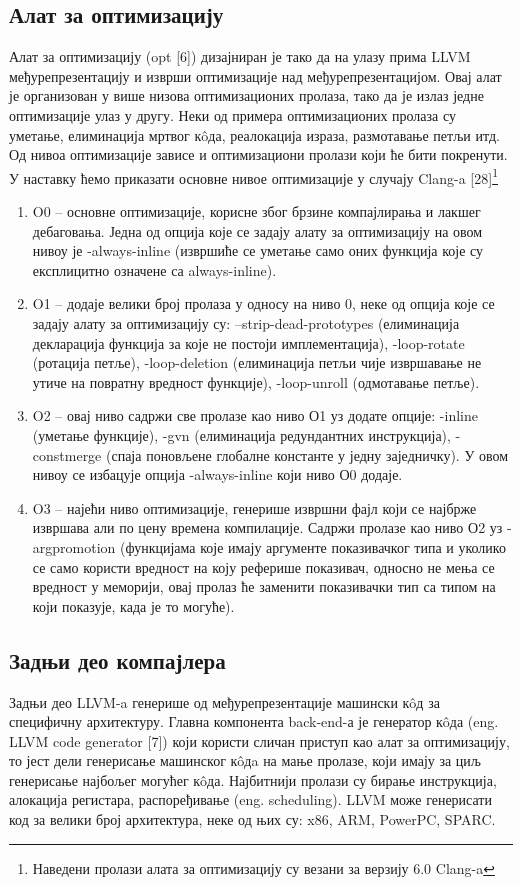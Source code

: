 \documentclass[12pt,oneside]{memoir}
\begin{document}
 \subsection{Алат за оптимизацију}
 Алат за оптимизацију (opt [6]) дизајниран је тако да на улазу прима LLVM
 међурепрезентацију и изврши оптимизације над међурепрезентацијом.
 Овај алат је организован у више низова оптимизационих пролаза, тако да је излаз
 једне оптимизације улаз у другу.
 Неки од примера оптимизационих пролаза су уметање, елиминација мртвог к\^{o}да,
 реалокација израза, размотавање петљи итд. 
 Од нивоа оптимизације зависе и оптимизациони пролази који ће бити покренути.
 У наставку ћемо приказати основне нивое оптимизације у случају Clang-a [28]\footnote{Наведени пролази алата за оптимизацију су везани за верзију 6.0 Clang-a}
 \begin{enumerate}
 \item O0 --  основне оптимизације, корисне због брзине компајлирања и лакшег
 			дебаговања.
 			Једна од опција које се задају алату за оптимизацију  на овом нивоу је
 			-always-inline (извршиће се уметање само оних функција које су експлицитно означене са always-inline).
 \item O1 -- додаје велики број пролаза у односу на ниво 0, неке од опција које
 			се задају алату за оптимизацију су:
           --strip-dead-prototypes (елиминација декларација функција за које не постоји имплементација), -loop-rotate (ротација петље), -loop-deletion (елиминација петљи чије извршавање не утиче на повратну вредност функције), -loop-unroll (одмотавање петље). 
           
 \item O2 -- овај ниво садржи све пролазе као ниво О1 уз додате опције: 
 -inline (уметање функције), -gvn (елиминација редундантних инструкција), -constmerge (спаја поновљене глобалне константе у једну заједничку).
 У овом нивоу се избацује опција -always-inline који ниво О0 додаје.
 \item O3 -- најећи ниво оптимизације, генерише извршни фајл који се најбрже извршава
 	али по цену времена компилације. Садржи пролазе као ниво О2 уз -argpromotion (функцијама које имају аргументе показивачког типа и уколико се само користи вредност
 	на коју реферише показивач, односно не мења се вредност у меморији, овај пролаз ће заменити показивачки тип са типом на који показује, када је то могуће).
 \end{enumerate}

\subsection{Задњи део компајлера} 
Задњи део LLVM-a генерише од међурепрезентације машински к\^{o}д за специфичну архитектуру. 
Главна компонента back-end-а је генератор к\^{o}да (eng. LLVM code generator [7]) који
користи сличан приступ као алат за оптимизацију, то јест дели генерисање машинског
к\^{o}дa на мање пролазе, који имају за циљ генерисање најбољег могућег к\^{o}да.
Најбитнији пролази су бирање инструкција, алокација регистара, распоређивање
(eng. scheduling).
LLVM може генерисати код за велики број архитектура, неке од њих су: x86, ARM,
PowerPC, SPARC.
\end{document}
